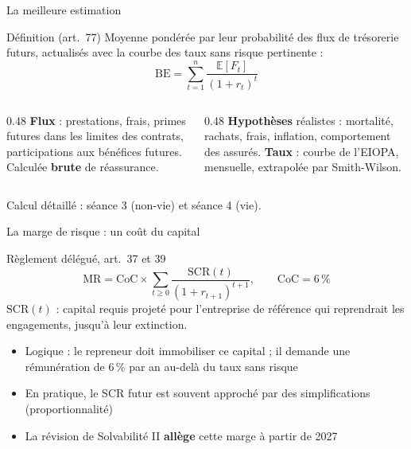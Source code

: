 \documentclass[10pt,aspectratio=169]{beamer}
\newcommand{\BE}{\mathrm{BE}}
\newcommand{\MR}{\mathrm{MR}}
\newcommand{\SCR}{\mathrm{SCR}}
\begin{document}
\begin{frame}{La meilleure estimation}
\begin{block}{Définition (art.~77)}
Moyenne pondérée par leur probabilité des flux de trésorerie futurs, actualisés avec la courbe
des taux sans risque pertinente :
\[ \BE = \sum_{t=1}^{n} \frac{\mathbb{E}[F_t]}{(1+r_t)^t} \]
\end{block}
\begin{columns}[T]
\begin{column}{0.48\textwidth}
\small
\textbf{Flux} : prestations, frais, primes futures dans les limites des contrats, participations
aux bénéfices futures. Calculée \textbf{brute} de réassurance.
\end{column}
\begin{column}{0.48\textwidth}
\small
\textbf{Hypothèses} réalistes : mortalité, rachats, frais, inflation, comportement des assurés.
\textbf{Taux} : courbe de l'EIOPA, mensuelle, extrapolée par Smith-Wilson.
\end{column}
\end{columns}
\vspace{0.2cm}
\begin{center}\small Calcul détaillé : séance 3 (non-vie) et séance 4 (vie).\end{center}
\end{frame}

\begin{frame}{La marge de risque : un coût du capital}
\begin{block}{Règlement délégué, art.~37 et 39}
\[ \MR = \mathrm{CoC} \times \sum_{t \geq 0} \frac{\SCR(t)}{(1+r_{t+1})^{t+1}}, \qquad \mathrm{CoC} = 6\,\% \]
$\SCR(t)$ : capital requis projeté pour l'entreprise de référence qui reprendrait les engagements,
jusqu'à leur extinction.
\end{block}
\begin{itemize}
  \item Logique : le repreneur doit immobiliser ce capital ; il demande une rémunération de 6\,\%
        par an au-delà du taux sans risque
  \item En pratique, le SCR futur est souvent approché par des simplifications (proportionnalité)
  \item La révision de Solvabilité II \textbf{allège} cette marge à partir de 2027
\end{itemize}
\end{frame}
\end{document}
